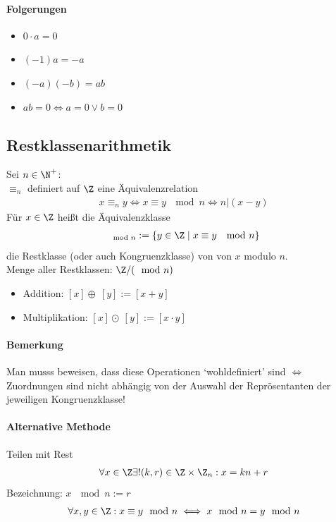 \paragraph{Folgerungen}
\begin{itemize}
	\item $0\cdot a=0$
	\item $(-1)a=-a$
	\item $(-a)(-b)=ab$
	\item $ab=0\iff a=0\lor b=0$
\end{itemize}
\subsection{Restklassenarithmetik}
\begin{definition}
	Sei $n\in \N^+$:\\
	$\equiv_n$ definiert auf $\Z$ eine Äquivalenzrelation 
	\begin{align*}
		x \equiv_n y \iff x \equiv y\ \mod n \iff n|(x-y)
	\end{align*}
	Für $x\in \Z$ heißt die Äquivalenzklasse
	\begin{align*}
		[x]_{\mod n}:=\{y\in \Z\mid x\equiv y\ \mod n\}
	\end{align*}
	die Restklasse (oder auch Kongruenzklasse) von von $x$ modulo $n$.\\[0.2cm]
	Menge aller Restklassen: $\Z/(\mod n)$
\end{definition}
\begin{itemize}
	\item Addition: $[x]\oplus\ [y]:=[x+y]$
	\item Multiplikation: $[x]\odot\ [y]:=[x\cdot y]$
\end{itemize}
\paragraph{Bemerkung} Man musss beweisen, dass diese Operationen `wohldefiniert' sind $\iff$ Zuordnungen sind nicht abhängig von der Auswahl der Reprösentanten der jeweiligen Kongruenzklasse!
\paragraph{Alternative Methode} Teilen mit Rest \begin{align*}
	\forall x \in \Z \exists!(k,r)\in \Z\times \Z_n: x = kn+r 
\end{align*}
Bezeichnung: $x\ \mod n := r$ 
\begin{align*}
	\forall x,y \in \Z: x\equiv y \mod n \iff x \mod n = y \mod n
\end{align*}
